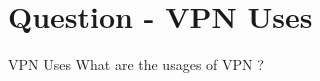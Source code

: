\section{Question - VPN Uses}

\begin{questionBox}{VPN Uses}
    What are the usages of VPN ?
\end{questionBox}

